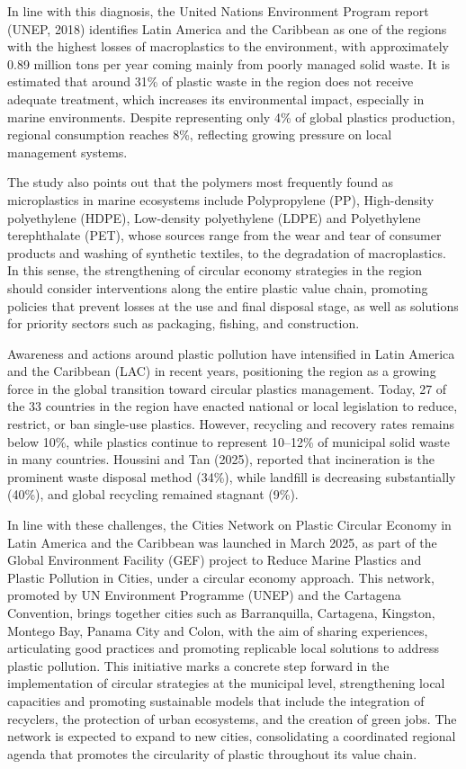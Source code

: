 \documentclass[
  12pt,
  oneside]{book}
\begin{document}
In line with this diagnosis, the United Nations Environment Program
report (UNEP, 2018) identifies Latin America and the Caribbean as one of
the regions with the highest losses of macroplastics to the environment,
with approximately 0.89 million tons per year coming mainly from poorly
managed solid waste. It is estimated that around 31\% of plastic waste
in the region does not receive adequate treatment, which increases its
environmental impact, especially in marine environments. Despite
representing only 4\% of global plastics production, regional
consumption reaches 8\%, reflecting growing pressure on local management
systems.

The study also points out that the polymers most frequently found as
microplastics in marine ecosystems include Polypropylene (PP),
High-density polyethylene (HDPE), Low-density polyethylene (LDPE) and
Polyethylene terephthalate (PET), whose sources range from the wear and
tear of consumer products and washing of synthetic textiles, to the
degradation of macroplastics. In this sense, the strengthening of
circular economy strategies in the region should consider interventions
along the entire plastic value chain, promoting policies that prevent
losses at the use and final disposal stage, as well as solutions for
priority sectors such as packaging, fishing, and construction.

Awareness and actions around plastic pollution have intensified in Latin
America and the Caribbean (LAC) in recent years, positioning the region
as a growing force in the global transition toward circular plastics
management. Today, 27 of the 33 countries in the region have enacted
national or local legislation to reduce, restrict, or ban single-use
plastics. However, recycling and recovery rates remains below 10\%,
while plastics continue to represent 10--12\% of municipal solid waste
in many countries. Houssini and Tan (2025), reported that incineration
is the prominent waste disposal method (34\%), while landfill is
decreasing substantially (40\%), and global recycling remained stagnant
(9\%).

In line with these challenges, the Cities Network on Plastic Circular
Economy in Latin America and the Caribbean was launched in March 2025,
as part of the Global Environment Facility (GEF) project to Reduce
Marine Plastics and Plastic Pollution in Cities, under a circular
economy approach. This network, promoted by UN Environment Programme
(UNEP) and the Cartagena Convention, brings together cities such as
Barranquilla, Cartagena, Kingston, Montego Bay, Panama City and Colon,
with the aim of sharing experiences, articulating good practices and
promoting replicable local solutions to address plastic pollution. This
initiative marks a concrete step forward in the implementation of
circular strategies at the municipal level, strengthening local
capacities and promoting sustainable models that include the integration
of recyclers, the protection of urban ecosystems, and the creation of
green jobs. The network is expected to expand to new cities,
consolidating a coordinated regional agenda that promotes the
circularity of plastic throughout its value chain.
\end{document}
